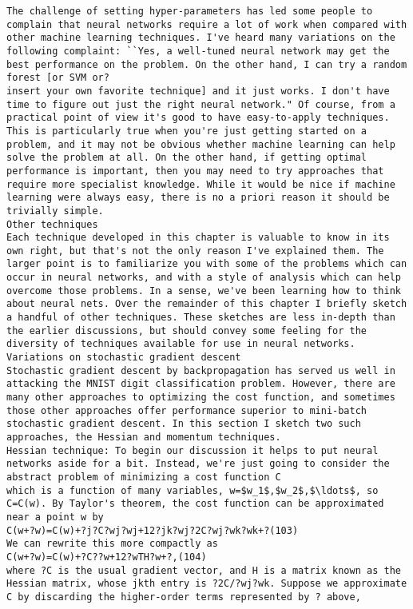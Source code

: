 \begin{lstlisting}
The challenge of setting hyper-parameters has led some people to complain that neural networks require a lot of work when compared with other machine learning techniques. I've heard many variations on the following complaint: ``Yes, a well-tuned neural network may get the best performance on the problem. On the other hand, I can try a random forest [or SVM or?
insert your own favorite technique] and it just works. I don't have time to figure out just the right neural network." Of course, from a practical point of view it's good to have easy-to-apply techniques. This is particularly true when you're just getting started on a problem, and it may not be obvious whether machine learning can help solve the problem at all. On the other hand, if getting optimal performance is important, then you may need to try approaches that require more specialist knowledge. While it would be nice if machine learning were always easy, there is no a priori reason it should be trivially simple.
Other techniques
Each technique developed in this chapter is valuable to know in its own right, but that's not the only reason I've explained them. The larger point is to familiarize you with some of the problems which can occur in neural networks, and with a style of analysis which can help overcome those problems. In a sense, we've been learning how to think about neural nets. Over the remainder of this chapter I briefly sketch a handful of other techniques. These sketches are less in-depth than the earlier discussions, but should convey some feeling for the diversity of techniques available for use in neural networks.
Variations on stochastic gradient descent
Stochastic gradient descent by backpropagation has served us well in attacking the MNIST digit classification problem. However, there are many other approaches to optimizing the cost function, and sometimes those other approaches offer performance superior to mini-batch stochastic gradient descent. In this section I sketch two such approaches, the Hessian and momentum techniques.
Hessian technique: To begin our discussion it helps to put neural networks aside for a bit. Instead, we're just going to consider the abstract problem of minimizing a cost function C
which is a function of many variables, w=$w_1$,$w_2$,$\ldots$, so C=C(w). By Taylor's theorem, the cost function can be approximated near a point w by 
C(w+?w)=C(w)+?j?C?wj?wj+12?jk?wj?2C?wj?wk?wk+?(103)
We can rewrite this more compactly as 
C(w+?w)=C(w)+?C??w+12?wTH?w+?,(104)
where ?C is the usual gradient vector, and H is a matrix known as the Hessian matrix, whose jkth entry is ?2C/?wj?wk. Suppose we approximate C by discarding the higher-order terms represented by ? above, 

\end{lstlisting}
